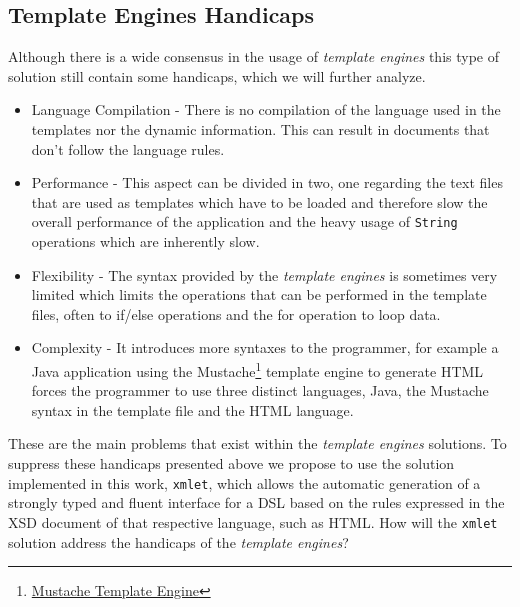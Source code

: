\subsection{Template Engines Handicaps}
\label{sec:templateengineshandicaps}

Although there is a wide consensus in the usage of \textit{template engines} this type of solution still contain some handicaps, which we will further analyze.

\begin{itemize}
	\item Language Compilation - There is no compilation of the language used in the templates nor the dynamic information. This can result in documents that don't follow the language rules.
	\item Performance - This aspect can be divided in two, one regarding the text files that are used as templates which have to be loaded and therefore slow the overall performance of the application and the heavy usage of \texttt{String} operations which are inherently slow.
	\item Flexibility - The syntax provided by the \textit{template engines} is sometimes very limited which limits the operations that can be performed in the template files, often to if/else operations and the for operation to loop data.
	\item Complexity - It introduces more syntaxes to the programmer, for example a Java application using the Mustache\footnote{\href{https://mustache.github.io/}{Mustache Template Engine}} template engine to generate \ac{HTML} forces the programmer to use three distinct languages, Java, the Mustache syntax in the template file and the \ac{HTML} language.
\end{itemize}

\noindent
These are the main problems that exist within the \textit{template engines} solutions. To suppress these handicaps presented above we propose to use the solution implemented in this work, \texttt{xmlet}, which allows the automatic generation of a strongly typed and fluent interface for a \ac{DSL} based on the rules expressed in the \ac{XSD} document of that respective language, such as \ac{HTML}. How will the \texttt{xmlet} solution address the handicaps of the \textit{template engines}?

